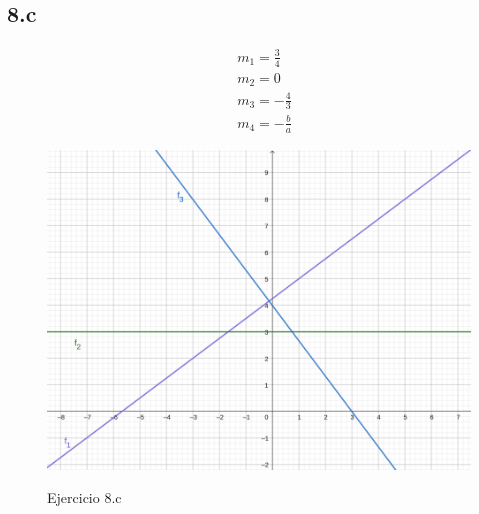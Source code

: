 \documentclass{article}
\begin{document}
\subsection*{8.c}
\label{subsec:8.c}

\begin{subequations}
\begin{align}
& m_1 = \frac{3}{4} \\
& m_2 = 0 \\
& m_3 = -\frac{4}{3} \\
& m_4 = -\frac{b}{a}
\end{align}
\end{subequations}

\newpage

\begin{figure}[ht]
\caption{Ejercicio 8.c}
\includegraphics[scale=2.5]{../img/guide_01/ex_08c.png} 
\centering
\label{fig:8c}
\end{figure}
\end{document}
